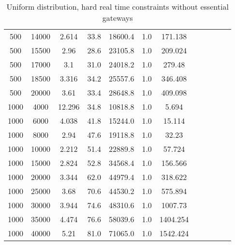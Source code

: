 \begin{table}[htb]
\begin{tabular}{|c|c|c|c|c|c|c|c|c|c|c|c|}
		500 & 14000 & 2.614 & 33.8 & 18600.4 & 1.0 & 171.138 & & & & &  \\ 
		500 & 15500 & 2.96 & 28.6 & 23105.8 & 1.0 & 209.024 & & & & &  \\ 
		500 & 17000 & 3.1 & 31.0 & 24018.2 & 1.0 & 279.48 & & & & &  \\ 
		500 & 18500 & 3.316 & 34.2 & 25557.6 & 1.0 & 346.408 & & & & &  \\ 
		500 & 20000 & 3.61 & 33.4 & 28648.8 & 1.0 & 409.098 & & & & &  \\ 
		1000 & 4000 & 12.296 & 34.8 & 10818.8 & 1.0 & 5.694 & & & & &  \\ 
		1000 & 6000 & 4.038 & 41.8 & 15244.0 & 1.0 & 15.114 & & & & &  \\ 
		1000 & 8000 & 2.94 & 47.6 & 19118.8 & 1.0 & 32.23 & & & & &  \\ 
		1000 & 10000 & 2.212 & 51.4 & 22889.8 & 1.0 & 57.724 & & & & &  \\ 
		1000 & 15000 & 2.824 & 52.8 & 34568.4 & 1.0 & 156.566 & & & & &  \\ 
		1000 & 20000 & 3.344 & 62.0 & 44979.4 & 1.0 & 318.622 & & & & &  \\ 
		1000 & 25000 & 3.68 & 70.6 & 44530.2 & 1.0 & 575.894 & & & & &  \\ 
		1000 & 30000 & 3.944 & 74.6 & 48310.6 & 1.0 & 1007.73 & & & & &  \\ 
		1000 & 35000 & 4.474 & 76.6 & 58039.6 & 1.0 & 1404.254 & & & & &  \\ 
		1000 & 40000 & 5.21 & 81.0 & 71065.0 & 1.0 & 1542.424 & & & & &  \\ 
		\hline 
	\end{tabular} 
	\caption{Uniform distribution, hard real time constraints without essential gateways} 
	\label{tab:unif_hard_n_esc} 
\end{table} 

